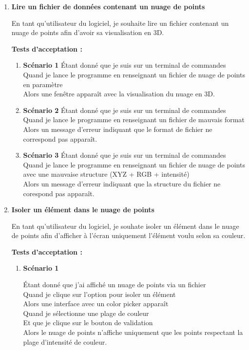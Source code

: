\documentclass[12pt,titlepage,french]{article}
\begin{document}
\begin{enumerate}
    \item \textbf{Lire un fichier de données contenant un nuage de points}
    
En tant qu'utilisateur du logiciel, je souhaite lire un fichier contenant un nuage de points afin d'avoir sa visualisation en 3D.

\textbf{Tests d'acceptation :}

\begin{enumerate}
    \item \textbf{Scénario 1}
Étant donné que je suis sur un terminal de commandes\\
Quand je lance le programme en renseignant un fichier de nuage de points en paramètre\\
Alors une fenêtre apparaît avec la visualisation du nuage en 3D.

    \item \textbf{Scénario 2}
Étant donné que je suis sur un terminal de commandes\\
Quand je lance le programme en renseignant un fichier de mauvais format\\
Alors un message d'erreur indiquant que le format de fichier ne correspond pas apparaît.

    \item \textbf{Scénario 3}
Étant donné que je suis sur un terminal de commandes\\
Quand je lance le programme en renseignant un fichier de nuage de points avec une mauvaise structure (XYZ + RGB + intensité)\\
Alors un message d'erreur indiquant que la structure du fichier ne corespond pas apparaît.

\end{enumerate}

    \item \textbf{Isoler un élément dans le nuage de points}
    
En tant qu'utilisateur du logiciel, je souhate isoler un élément dans le nuage de points afin d'afficher à l'écran uniquement l'élément voulu selon sa couleur.

\textbf{Tests d'acceptation :}

\begin{enumerate}
    \item \textbf{Scénario 1}
    
Étant donné que j'ai affiché un nuage de points via un fichier\\
Quand je clique sur l'option pour isoler un élément\\
Alors une interface avec un color picker apparaît\\
Quand je sélectionne une plage de couleur\\
Et que je clique sur le bouton de validation\\
Alors le nuage de points n'affiche uniquement que les points respectant la plage d'intensité de couleur.


\end{enumerate}
\end{enumerate}
\end{document}
